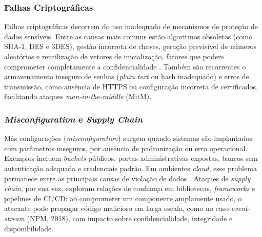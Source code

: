 \subsubsection{
    Falhas Criptográficas
}
Falhas criptográficas decorrem do uso inadequado de mecanismos de proteção de dados sensíveis. Entre as causas mais comuns estão algoritmos obsoletos (como SHA-1, DES e 3DES), gestão incorreta de chaves, geração previsível de números aleatórios e reutilização de vetores de inicialização, fatores que podem comprometer completamente a confidencialidade \cite{Blessing2021RollYourOwnCrypto}. Também são recorrentes o armazenamento inseguro de senhas (\textit{plain text} ou hash inadequado) e erros de transmissão, como ausência de HTTPS ou configuração incorreta de certificados, facilitando ataques \textit{man-in-the-middle} (MitM).


\subsubsection{\textit{Misconfiguration} e \textit{Supply Chain}}

Más configurações (\textit{misconfiguration}) surgem quando sistemas são implantados com parâmetros inseguros, por ausência de padronização ou erro operacional. Exemplos incluem \textit{buckets} públicos, portas administrativas expostas, bancos sem autenticação adequada e credenciais padrão. Em ambientes \textit{cloud}, esse problema permanece entre as principais causas de violação de dados \cite{CloudSecurityAlliance2024TopThreats}. Ataques de \textit{supply chain}, por sua vez, exploram relações de confiança em bibliotecas, \textit{frameworks} e pipelines de CI/CD: ao comprometer um componente amplamente usado, o atacante pode propagar código malicioso em larga escala, como no caso \textit{event-stream} (NPM, 2018), com impacto sobre confidencialidade, integridade e disponibilidade.
